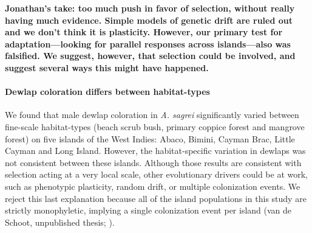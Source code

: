 

\textbf{Jonathan's take: too much push in favor of selection, without really having much evidence. Simple models of genetic drift are ruled out and we don’t think it is plasticity. However, our primary test for adaptation—looking for parallel responses across islands—also was falsified. We suggest, however, that selection could be involved, and suggest several ways this might have happened.}

\paragraph{Dewlap coloration differs between habitat-types} We found that male dewlap coloration in \textit{A. sagrei} significantly varied between fine-scale habitat-types (beach scrub bush, primary coppice forest and mangrove forest) on five islands of the West Indies: Abaco, Bimini, Cayman Brac, Little Cayman and Long Island. However, the habitat-specific variation in dewlaps was not consistent between these islands. Although those results are consistent with selection acting at a very local scale, other evolutionary drivers could be at work, such as phenotypic plasticity, random drift, or multiple colonization events. We reject this last explanation because all of the island populations in this study are strictly monophyletic, implying a single colonization event per island (van de Schoot, unpublished thesis; \citealt{Driessens2017, Reynolds2020}).

